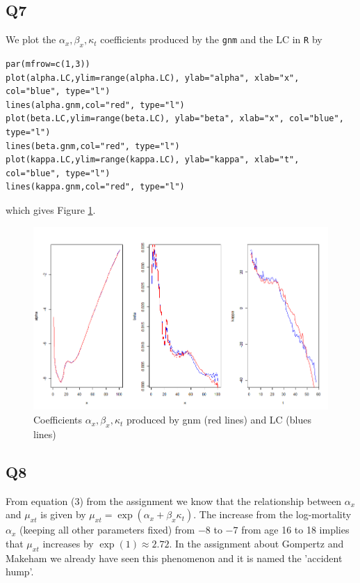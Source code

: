 \documentclass[11pt]{article}
\begin{document}
\subsection*{Q7}

We plot the $\alpha_x, \beta_x, \kappa_t$ coefficients produced by the \verb|gnm| and the LC in \verb|R| by

\begin{verbatim}
par(mfrow=c(1,3))
plot(alpha.LC,ylim=range(alpha.LC), ylab="alpha", xlab="x", col="blue", type="l")
lines(alpha.gnm,col="red", type="l")
plot(beta.LC,ylim=range(beta.LC), ylab="beta", xlab="x", col="blue", type="l")
lines(beta.gnm,col="red", type="l")
plot(kappa.LC,ylim=range(kappa.LC), ylab="kappa", xlab="t", col="blue", type="l")
lines(kappa.gnm,col="red", type="l")
\end{verbatim}
which gives Figure \ref{Figure_Question7}.
\begin{center}
	\begin{figure}[H]
		
		\includegraphics[scale=0.75]{NL3_Question7.png}
		
		\caption{Coefficients $\alpha_x, \beta_x, \kappa_t$ produced by gnm (red lines) and LC (blues lines) }
		\label{Figure_Question7}
		
	\end{figure}
\end{center}

\subsection*{Q8}
From equation (3) from the assignment we know that the relationship between $\alpha_x$ and $\mu_{xt}$ is given by $\mu_{xt} = \exp(\alpha_x + \beta_x \kappa_t)$. The increase from the log-mortality $\alpha_x$ (keeping all other parameters fixed) from $-8$ to $-7$ from age 16 to 18 implies that $\mu_{xt}$ increases by $\exp(1) \approx 2.72$. In the assignment about Gompertz and Makeham we already have seen this phenomenon and it is named the 'accident hump'.
\end{document}
